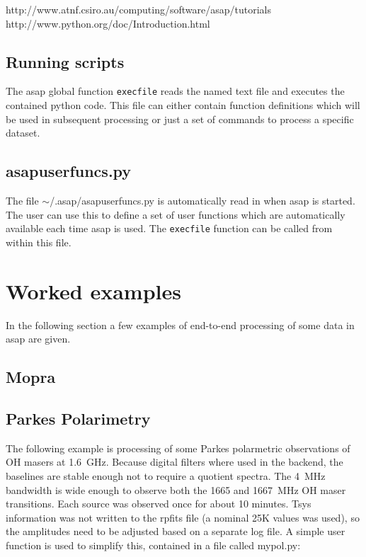 \documentclass[11pt]{article}
\newcommand{\cmd}[1]{{\tt #1}}
\begin{document}
\hspace{1cm} http://www.atnf.csiro.au/computing/software/asap/tutorials
\hspace{1cm} http://www.python.org/doc/Introduction.html

\subsection{Running scripts}

The asap global function \cmd{execfile} reads the named text file and
executes the contained python code. This file can either contain
function definitions which will be used in subsequent processing or
just a set of commands to process a specific dataset.

\subsection{asapuserfuncs.py}

The file $\sim$/.asap/asapuserfuncs.py is automatically read in when
asap is started. The user can use this to define a set of user
functions which are automatically available each time asap is
used. The \cmd{execfile} function can be called from within this file.

\section{Worked examples}

In the following section a few examples of end-to-end processing of
some data in asap are given. 

\subsection{Mopra}

\subsection{Parkes Polarimetry}

The following example is processing of some Parkes polarmetric
observations of OH masers at 1.6~GHz. Because digital filters where
used in the backend, the baselines are stable enough not to require a
quotient spectra. The 4~MHz bandwidth is wide enough to observe both
the 1665 and 1667~MHz OH maser transitions. Each source was observed
once for about 10 minutes. Tsys information was not written to the
rpfits file (a nominal 25K values was used), so the amplitudes need
to be adjusted based on a separate log file. A simple user function is
used to simplify this, contained in a file called mypol.py:
\end{document}
